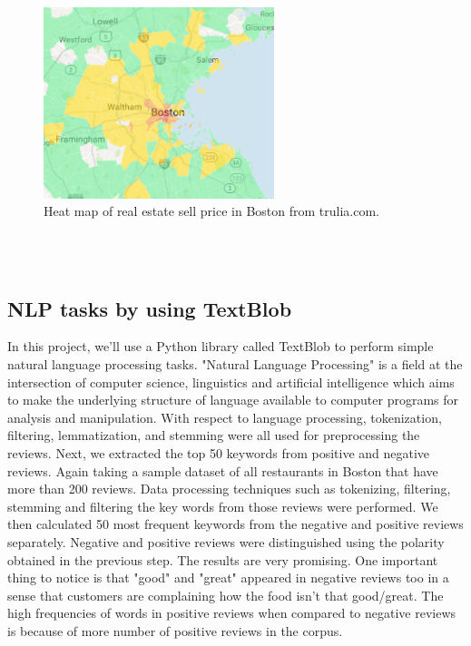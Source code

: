 \documentclass[a4paper]{article}
\begin{document}
\begin{figure}[htbp]
\centering
\includegraphics[width=0.6\textwidth]{Picture4.png}
\caption{\label{fig:data}Heat map of real estate sell price in Boston from trulia.com. }
\end{figure}
\
\\
\\
\subsection{NLP tasks by using TextBlob}
In this project, we'll use a Python library called TextBlob to perform simple natural language processing tasks. "Natural Language Processing" is a field at the intersection of computer science, linguistics and artificial intelligence which aims to make the underlying structure of language available to computer programs for analysis and manipulation. With respect to language processing, tokenization, filtering, lemmatization, and stemming were all used for preprocessing the reviews. 
Next, we extracted the top 50 keywords from positive and negative reviews. Again taking a sample dataset of all restaurants in Boston that have more than 200 reviews. Data processing techniques such as tokenizing, filtering, stemming and filtering the key words from those reviews were performed. We then calculated 50 most frequent keywords from the negative and positive reviews separately. Negative and positive reviews were distinguished using the polarity obtained in the previous step. The results are very promising. One important thing to notice is that "good" and "great" appeared in negative reviews too in a sense that customers are complaining how the food isn't that good/great. The high frequencies of words in positive reviews when compared to negative reviews is because of more number of positive reviews in the corpus. 
\end{document}
